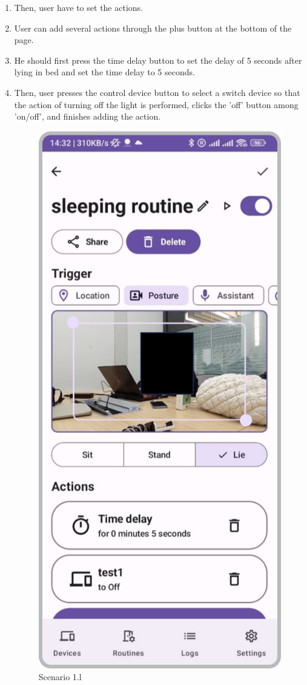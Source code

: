 \begin{enumerate}
\begin{enumerate}
              \newpage
              \item Then, user have to set the actions. \\
              \item User can add several actions through the plus button at the bottom of the page. \\
              \item He should first press the time delay button to set the delay of 5 seconds after lying in bed and set the time delay to 5 seconds. \\
              \item Then, user presses the control device button to select a switch device so that the action of turning off the light is performed, clicks the 'off' button among 'on/off', and finishes adding the action.\\
                    \begin{figure}[hbt!]
                        \centering
                        \includegraphics[width=0.5\linewidth]{imgs/usercase/usercase_scenario1_12.png}
                        \caption{Scenario 1.l}                        
                    \end{figure}
              \newpage

\end{enumerate}
\end{enumerate}
